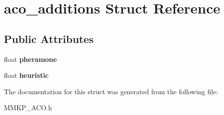 \hypertarget{structaco__additions}{\section{aco\+\_\+additions Struct Reference}
\label{structaco__additions}
}
\subsection*{Public Attributes}
\begin{DoxyCompactItemize}
\item 
\hypertarget{structaco__additions_a5337f627e12138a8c0c68139a3614f16}{float {\bfseries pheramone}}\label{structaco__additions_a5337f627e12138a8c0c68139a3614f16}

\item 
\hypertarget{structaco__additions_a38ebebb7373e5d7af1bfeafaca4680d2}{float {\bfseries heuristic}}\label{structaco__additions_a38ebebb7373e5d7af1bfeafaca4680d2}

\end{DoxyCompactItemize}


The documentation for this struct was generated from the following file\+:\begin{DoxyCompactItemize}
\item 
M\+M\+K\+P\+\_\+\+A\+C\+O.\+h\end{DoxyCompactItemize}
